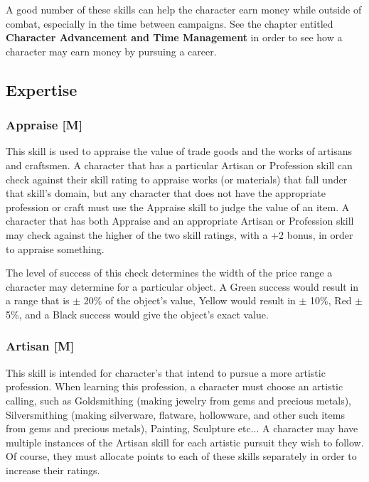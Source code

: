 \documentclass[oneside]{book}
\begin{document}
\begin{multicols}{2}
A good number of these skills can help the character earn money while outside of combat, especially in the time between campaigns. See the chapter entitled \textbf{Character Advancement and Time Management} in order to see how a character may earn money by pursuing a career. 
\subsection{Expertise}
\subsubsection{Appraise [M]}
This skill is used to appraise the value of trade goods and the works of artisans and craftsmen. A character that has a particular Artisan or Profession skill can check against their skill rating to appraise works (or materials) that fall under that skill's domain, but any character that does not have the appropriate profession or craft must use the Appraise skill to judge the value of an item. A character that has both Appraise and an appropriate Artisan or Profession skill may check against the higher of the two skill ratings, with a +2 bonus, in order to appraise something. 

The level of success of this check determines the width of the price range a character may determine for a particular object. A Green success would result in a range that is $\pm$ 20\% of the object's value, Yellow would result in $\pm$ 10\%, Red $\pm$ 5\%, and a Black success would give the object's exact value.
\subsubsection{Artisan [M]}
This skill is intended for character's that intend to pursue a more artistic profession. When learning this profession, a character must choose an artistic calling, such as Goldsmithing (making jewelry from gems and precious metals), Silversmithing (making silverware, flatware, hollowware, and other such items from gems and precious metals), Painting, Sculpture etc... A character may have multiple instances of the Artisan skill for each artistic pursuit they wish to follow. Of course, they must allocate points to each of these skills separately in order to increase their ratings. 


\end{multicols}
\end{document}
